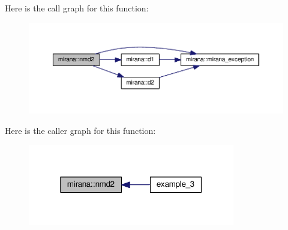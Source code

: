 Here is the call graph for this function\-:\nopagebreak
\begin{figure}[H]
\begin{center}
\leavevmode
\includegraphics[width=350pt]{classmirana_a04bd9101c8bdc2f8b69892bd773f3055_cgraph}
\end{center}
\end{figure}




Here is the caller graph for this function\-:
\nopagebreak
\begin{figure}[H]
\begin{center}
\leavevmode
\includegraphics[width=256pt]{classmirana_a04bd9101c8bdc2f8b69892bd773f3055_icgraph}
\end{center}
\end{figure}


